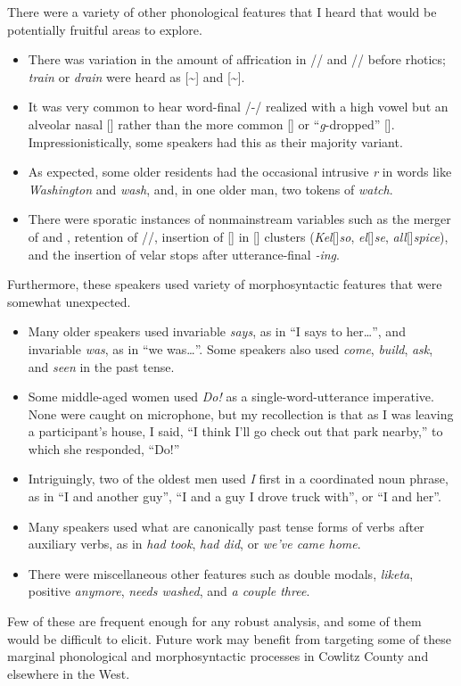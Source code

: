 There were a variety of other phonological features that I heard that would be potentially fruitful areas to explore.
\begin{itemize}
    \item There was variation in the amount of affrication in // and // before rhotics; \textit{train} or \textit{drain} were heard as [\textasciitilde{}] and [\textasciitilde{}].
    \item It was very common to hear word-final /-/  realized with a high vowel but an alveolar nasal [] rather than the more common [] or ``\textit{g}-dropped'' []. Impressionistically, some speakers had this as their majority variant.
    \item As expected, some older residents had the occasional intrusive \textit{r} in words like \textit{Washington} and \textit{wash}, and, in one older man, two tokens of \textit{watch}.
    \item There were sporatic instances of nonmainstream variables such as the merger of \north and \force, retention of //, insertion of [] in [] clusters (\textit{Kel}[]\textit{so}, \textit{el}[]\textit{se}, \textit{all}[]\textit{spice}), and the insertion of velar stops after utterance-final \textit{-ing}.
\end{itemize}
Furthermore, these speakers used variety of morphosyntactic features that were somewhat unexpected.
\begin{itemize}
    \item Many older speakers used invariable \textit{says}, as in ``I says to her\ldots'', and invariable \textit{was}, as in ``we was\ldots''. Some speakers also used \textit{come}, \textit{build}, \textit{ask}, and \textit{seen} in the past tense.
    \item Some middle-aged women used \textit{Do!} as a single-word-utterance imperative. None were caught on microphone, but my recollection is that as I was leaving a participant's house, I said, ``I think I'll go check out that park nearby,'' to which she responded, ``Do!''
    \item Intriguingly, two of the oldest men used \textit{I} first in a coordinated noun phrase, as in ``I and another guy'', ``I and a guy I drove truck with'', or ``I and her''.
    \item Many speakers used what are canonically past tense forms of verbs after auxiliary verbs, as in \textit{had took}, \textit{had did}, or \textit{we've came home}.
    \item There were miscellaneous other features such as double modals, \textit{liketa}, positive \textit{anymore}, \textit{needs washed}, and \textit{a couple three}.
\end{itemize}
Few of these are frequent enough for any robust analysis, and some of them would be difficult to elicit. Future work may benefit from targeting some of these marginal phonological and morphosyntactic processes in Cowlitz County and elsewhere in the West.

